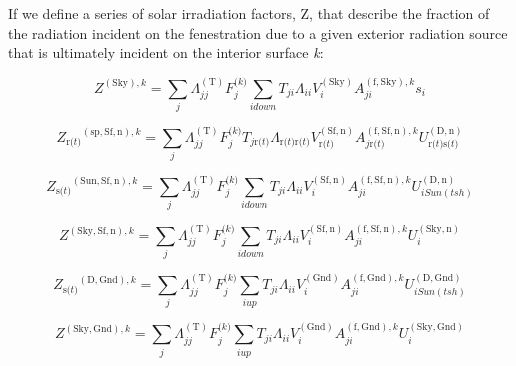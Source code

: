 If we define a series of solar irradiation factors, Z, that describe the fraction of the radiation incident on the fenestration due to a given exterior radiation source that is ultimately incident on the interior surface \emph{k}:

\begin{equation}
{Z^{{\mathrm{(Sky), }}k}} = \sum\limits_j {\Lambda_{jj}^{{\mathrm{(T)}}}F_j^{{\mathrm{(}}k{\mathrm{)}}}\sum\limits_{i{\mathrm{ }}down} {{T_{ji}}{\Lambda_{ii}}V_i^{{\mathrm{(Sky)}}}A_{ji}^{{\mathrm{(f, Sky), }}k}{s_i}} }
\label{eq:ZSkykEquation}
\end{equation}

\begin{equation}
{Z_{{\mathrm{r(}}t{\mathrm{)}}}}^{{\mathrm{(sp, Sf, n)}},k} = \sum\limits_j {\Lambda_{jj}^{{\mathrm{(T)}}}F_j^{{\mathrm{(}}k{\mathrm{)}}}{T_{j{\mathrm{ r(}}t{\mathrm{)}}}}{\Lambda_{{\mathrm{ r(}}t{\mathrm{) r(}}t{\mathrm{)}}}}V_{{\mathrm{ r(}}t{\mathrm{)}}}^{{\mathrm{(Sf, n)}}}A_{j{\mathrm{ r(}}t{\mathrm{)}}}^{{\mathrm{(f, Sf, n), }}k}U_{{\mathrm{ r(}}t{\mathrm{) s(}}t{\mathrm{)}}}^{{\mathrm{(D,n)}}}}
\end{equation}

\begin{equation}
{Z_{{\mathrm{s(}}t{\mathrm{)}}}}^{{\mathrm{(Sun, Sf, n)}},k} = \sum\limits_j {\Lambda_{jj}^{{\mathrm{(T)}}}F_j^{{\mathrm{(}}k{\mathrm{)}}}\sum\limits_{i{\mathrm{ }}down} {{T_{ji}}{\Lambda_{ii}}V_i^{{\mathrm{(Sf, n)}}}A_{ji}^{{\mathrm{(f, Sf, n), }}k}U_{i{\mathrm{ }}Sun(tsh)}^{{\mathrm{(D,n)}}}} }
\end{equation}

\begin{equation}
{Z^{{\mathrm{(Sky, Sf, n)}},k}} = \sum\limits_j {\Lambda_{jj}^{{\mathrm{(T)}}}F_j^{{\mathrm{(}}k{\mathrm{)}}}\sum\limits_{i{\mathrm{ }}down} {{T_{ji}}{\Lambda_{ii}}V_i^{{\mathrm{(Sf, n)}}}A_{ji}^{{\mathrm{(f, Sf, n), }}k}U_i^{{\mathrm{(Sky, n)}}}} }
\end{equation}

\begin{equation}
{Z_{{\mathrm{s(}}t{\mathrm{)}}}}^{{\mathrm{(D, Gnd)}},k} = \sum\limits_j {\Lambda_{jj}^{{\mathrm{(T)}}}F_j^{{\mathrm{(}}k{\mathrm{)}}}\sum\limits_{i{\mathrm{ }}up} {{T_{ji}}{\Lambda_{ii}}V_i^{{\mathrm{(Gnd)}}}A_{ji}^{{\mathrm{(f, Gnd), }}k}U_{i{\mathrm{ }}Sun(tsh)}^{{\mathrm{(D, Gnd)}}}} }
\end{equation}

\begin{equation}
{Z^{{\mathrm{(Sky, Gnd)}},k}} = \sum\limits_j {\Lambda_{jj}^{{\mathrm{(T)}}}F_j^{{\mathrm{(}}k{\mathrm{)}}}\sum\limits_{i{\mathrm{ }}up} {{T_{ji}}{\Lambda_{ii}}V_i^{{\mathrm{(Gnd)}}}A_{ji}^{{\mathrm{(f, Gnd), }}k}U_i^{{\mathrm{(Sky, Gnd)}}}} }
\end{equation}

